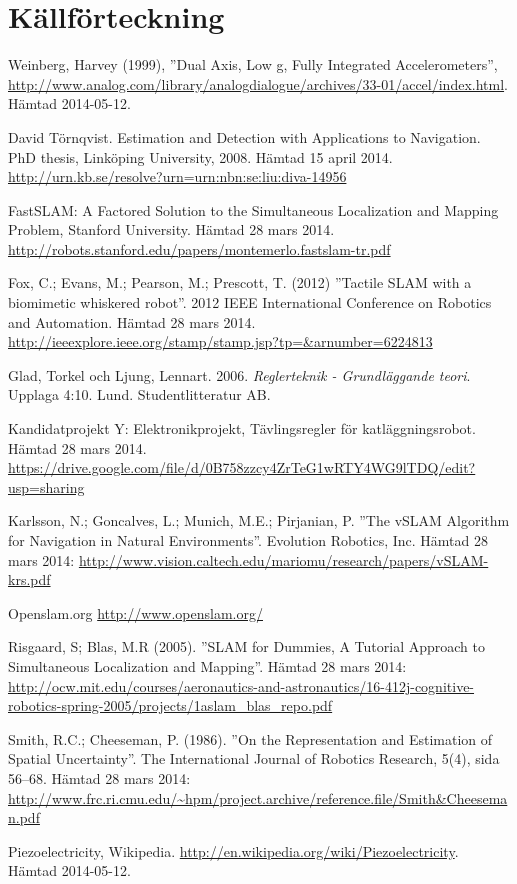 \documentclass[a4paper,12pt,fleqn]{article}
\begin{document}
\newpage 
\section*{Källförteckning} 

Weinberg, Harvey (1999), ''Dual Axis, Low g, Fully Integrated Accelerometers'', \url{http://www.analog.com/library/analogdialogue/archives/33-01/accel/index.html}. Hämtad 2014-05-12.

David Törnqvist. Estimation and Detection with Applications to Navigation. PhD thesis, Linköping University, 2008. Hämtad 15 april 2014.
\url{http://urn.kb.se/resolve?urn=urn:nbn:se:liu:diva-14956}

FastSLAM: A Factored Solution to the Simultaneous
Localization and Mapping Problem, Stanford University. Hämtad 28 mars 2014.
\url{http://robots.stanford.edu/papers/montemerlo.fastslam-tr.pdf}

Fox, C.; Evans, M.; Pearson, M.; Prescott, T. (2012)
''Tactile SLAM with a biomimetic whiskered robot''. 2012 IEEE International Conference on Robotics and Automation. Hämtad 28 mars 2014.
\url{http://ieeexplore.ieee.org/stamp/stamp.jsp?tp=&arnumber=6224813}

Glad, Torkel och Ljung, Lennart. 2006. \textit{Reglerteknik - Grundläggande teori}. Upplaga 4:10. Lund. Studentlitteratur AB.

Kandidatprojekt Y: Elektronikprojekt, Tävlingsregler för katläggningsrobot. Hämtad 28 mars 2014.  \url{https://drive.google.com/file/d/0B758zzcy4ZrTeG1wRTY4WG9lTDQ/edit?usp=sharing}

Karlsson, N.; Goncalves, L.; Munich, M.E.; Pirjanian, P.
''The vSLAM Algorithm for Navigation in Natural Environments''. Evolution Robotics, Inc. Hämtad 28 mars 2014:
\url{http://www.vision.caltech.edu/mariomu/research/papers/vSLAM-krs.pdf}

Openslam.org
\url{http://www.openslam.org/}

Risgaard, S; Blas, M.R (2005).
''SLAM for Dummies, A Tutorial Approach to Simultaneous Localization and Mapping''. 
Hämtad 28 mars 2014:
\url{http://ocw.mit.edu/courses/aeronautics-and-astronautics/16-412j-cognitive-robotics-spring-2005/projects/1aslam_blas_repo.pdf}

Smith, R.C.; Cheeseman, P. (1986). ''On the Representation and Estimation of Spatial Uncertainty''. The
International Journal of Robotics Research, 5(4), sida 56–68. Hämtad
28 mars 2014:
\url{http://www.frc.ri.cmu.edu/~hpm/project.archive/reference.file/Smith&Cheeseman.pdf}

Piezoelectricity, Wikipedia. \url{http://en.wikipedia.org/wiki/Piezoelectricity}. Hämtad 2014-05-12.
\end{document}

